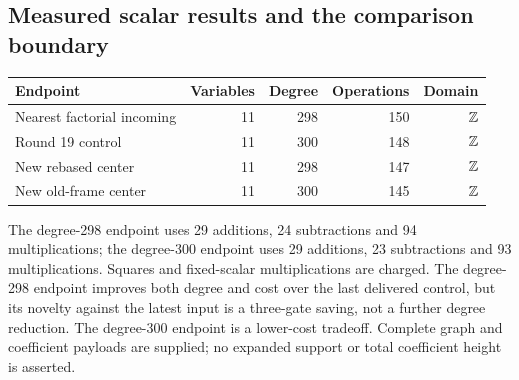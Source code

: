 \subsection{Measured scalar results and the comparison boundary}
\begin{center}\small
\begin{tabular}{@{}lrrrr@{}}\toprule
Endpoint & Variables & Degree & Operations & Domain\\\midrule
Nearest factorial incoming &11&298&150&$\mathbb Z$\\
Round 19 control &11&300&148&$\mathbb Z$\\
New rebased center &11&298&147&$\mathbb Z$\\
New old-frame center &11&300&145&$\mathbb Z$\\\bottomrule
\end{tabular}
\end{center}
The degree-298 endpoint uses 29 additions, 24 subtractions and 94
multiplications; the degree-300 endpoint uses 29 additions, 23 subtractions
and 93 multiplications. Squares and fixed-scalar multiplications are
charged. The degree-298 endpoint improves both degree and cost over the
last delivered control, but its novelty against the latest input is a
three-gate saving, not a further degree reduction. The degree-300 endpoint
is a lower-cost tradeoff. Complete graph and coefficient payloads are
supplied; no expanded support or total coefficient height is asserted.
